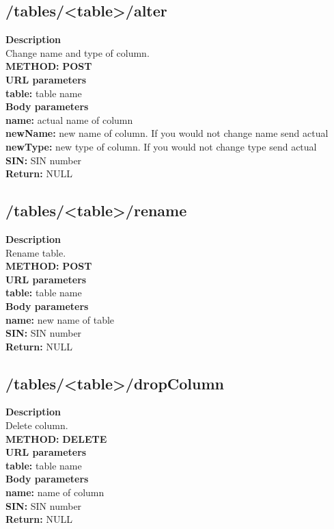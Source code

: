 \documentclass[a4paper, 12pt]{report}
\begin{document}
\subsection{/tables/<table>/alter}
\textbf{\color{redText} Description} \\
Change name and type of column. \\
\textbf{\color{redText} METHOD: } \textbf{POST} \\
\textbf{\color{redText} URL parameters} \\
\textbf{table: } table name\\
\textbf{\color{redText} Body parameters} \\
\textbf{name: } actual name of column\\
\textbf{newName: } new name of column. If you would not change name send actual\\
\textbf{newType: } new type of column. If you would not change type send actual\\
\textbf{SIN: } SIN number\\
\textbf{\color{redText} Return: } NULL

\subsection{/tables/<table>/rename}
\textbf{\color{redText} Description} \\
Rename table. \\
\textbf{\color{redText} METHOD: } \textbf{POST} \\
\textbf{\color{redText} URL parameters} \\
\textbf{table: } table name\\
\textbf{\color{redText} Body parameters} \\
\textbf{name: } new name of table\\
\textbf{SIN: } SIN number\\
\textbf{\color{redText} Return: } NULL

\subsection{/tables/<table>/dropColumn}
\textbf{\color{redText} Description} \\
Delete column. \\
\textbf{\color{redText} METHOD: } \textbf{DELETE} \\
\textbf{\color{redText} URL parameters} \\
\textbf{table: } table name\\
\textbf{\color{redText} Body parameters} \\
\textbf{name: } name of column\\
\textbf{SIN: } SIN number\\
\textbf{\color{redText} Return: } NULL
\end{document}

